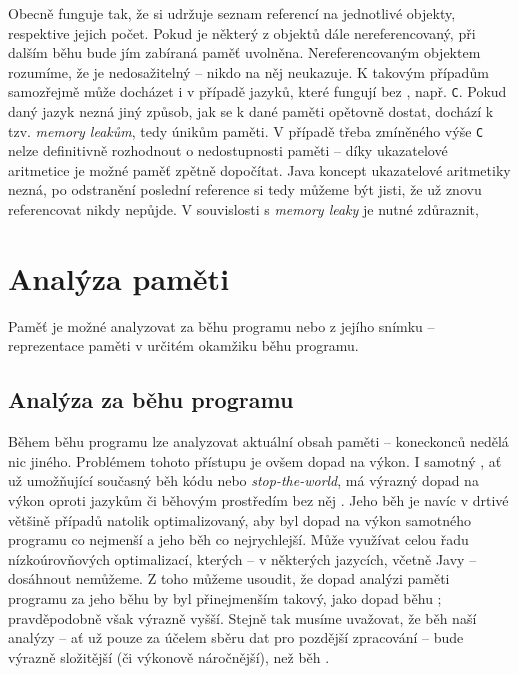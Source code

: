 Obecně  funguje tak, že si udržuje seznam referencí na jednotlivé objekty, respektive jejich počet. Pokud je některý z objektů dále nereferencovaný, při dalším běhu  bude jím zabíraná paměť uvolněna. Nereferencovaným objektem rozumíme, že je nedosažitelný -- nikdo na něj neukazuje. K takovým případům samozřejmě může docházet i v případě jazyků, které fungují bez , např. \texttt{C}. Pokud daný jazyk nezná jiný způsob, jak se k dané paměti opětovně dostat, dochází k tzv. \textit{memory leakům}, tedy únikům paměti. V případě třeba zmíněného výše \texttt{C} nelze definitivně rozhodnout o nedostupnosti paměti -- díky ukazatelové aritmetice je možné paměť zpětně dopočítat. Java koncept ukazatelové aritmetiky nezná, po odstranění poslední reference si tedy můžeme být jisti, že už znovu referencovat nikdy nepůjde. V souvislosti s \textit{memory leaky} je nutné zdůraznit,  






\chapter{Analýza paměti}

Paměť je možné analyzovat za běhu programu nebo z jejího snímku -- reprezentace paměti v určitém okamžiku běhu programu.

\section{Analýza za běhu programu}
Během běhu programu lze analyzovat aktuální obsah paměti --  koneckonců nedělá nic jiného. Problémem tohoto přístupu je ovšem dopad na výkon. I samotný , ať už umožňující současný běh kódu nebo \textit{stop-the-world}, má výrazný dopad na výkon oproti jazykům či běhovým prostředím bez něj \cite{gc}. Jeho běh je navíc v drtivé většině případů natolik optimalizovaný, aby byl dopad na výkon samotného programu co nejmenší a jeho běh co nejrychlejší. Může využívat celou řadu nízkoúrovňových optimalizací, kterých -- v některých jazycích, včetně Javy -- dosáhnout nemůžeme. Z toho můžeme usoudit, že dopad analýzi paměti programu za jeho běhu by byl přinejmenším takový, jako dopad běhu ; pravděpodobně však výrazně vyšší. Stejně tak musíme uvažovat, že běh naší analýzy -- ať už pouze za účelem sběru dat pro pozdější zpracování -- bude výrazně složitější (či výkonově náročnější), než běh .

